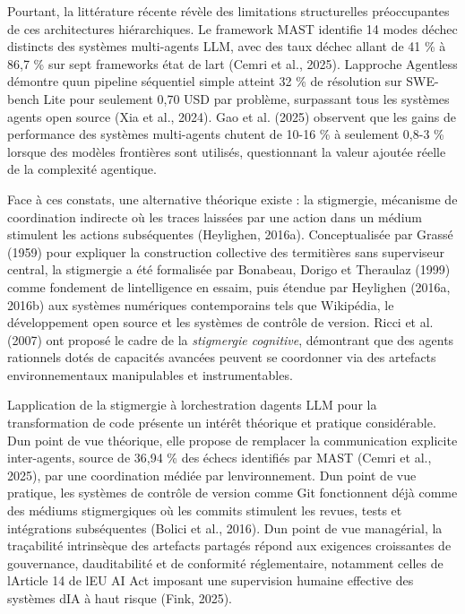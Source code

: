 \documentclass[12pt,a4paper]{article}
\begin{document}
Pourtant, la littérature récente révèle des limitations structurelles
préoccupantes de ces architectures hiérarchiques. Le framework MAST
identifie 14 modes d\textquotesingle échec distincts des systèmes
multi-agents LLM, avec des taux d\textquotesingle échec allant de 41 \%
à 86,7 \% sur sept frameworks état de l\textquotesingle art (Cemri et
al., 2025). L\textquotesingle approche Agentless démontre
qu\textquotesingle un pipeline séquentiel simple atteint 32 \% de
résolution sur SWE-bench Lite pour seulement 0,70 USD par problème,
surpassant tous les systèmes agents open source (Xia et al., 2024). Gao
et al. (2025) observent que les gains de performance des systèmes
multi-agents chutent de 10-16 \% à seulement 0,8-3 \% lorsque des
modèles frontières sont utilisés, questionnant la valeur ajoutée réelle
de la complexité agentique.

Face à ces constats, une alternative théorique existe : la stigmergie,
mécanisme de coordination indirecte où les traces laissées par une
action dans un médium stimulent les actions subséquentes (Heylighen,
2016a). Conceptualisée par Grassé (1959) pour expliquer la construction
collective des termitières sans superviseur central, la stigmergie a été
formalisée par Bonabeau, Dorigo et Theraulaz (1999) comme fondement de
l\textquotesingle intelligence en essaim, puis étendue par Heylighen
(2016a, 2016b) aux systèmes numériques contemporains tels que Wikipédia,
le développement open source et les systèmes de contrôle de version.
Ricci et al. (2007) ont proposé le cadre de la \emph{stigmergie
cognitive}, démontrant que des agents rationnels dotés de capacités
avancées peuvent se coordonner via des artefacts environnementaux
manipulables et instrumentables.

L\textquotesingle application de la stigmergie à
l\textquotesingle orchestration d\textquotesingle agents LLM pour la
transformation de code présente un intérêt théorique et pratique
considérable. D\textquotesingle un point de vue théorique, elle propose
de remplacer la communication explicite inter-agents, source de 36,94 \%
des échecs identifiés par MAST (Cemri et al., 2025), par une
coordination médiée par l\textquotesingle environnement.
D\textquotesingle un point de vue pratique, les systèmes de contrôle de
version comme Git fonctionnent déjà comme des médiums stigmergiques où
les commits stimulent les revues, tests et intégrations subséquentes
(Bolici et al., 2016). D\textquotesingle un point de vue managérial, la
traçabilité intrinsèque des artefacts partagés répond aux exigences
croissantes de gouvernance, d\textquotesingle auditabilité et de
conformité réglementaire, notamment celles de l\textquotesingle Article
14 de l\textquotesingle EU AI Act imposant une supervision humaine
effective des systèmes d\textquotesingle IA à haut risque (Fink, 2025).
\end{document}
